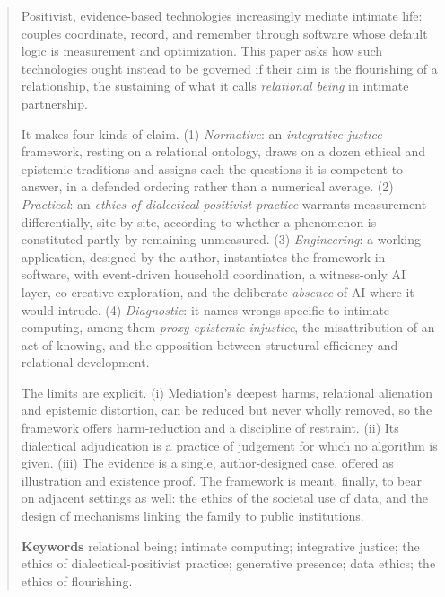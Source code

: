 
\begin{abstract}
\noindent
Positivist, evidence-based technologies increasingly mediate intimate life: couples coordinate, record, and remember through software whose default logic is measurement and optimization. This paper asks how such technologies ought instead to be governed if their aim is the flourishing of a relationship, the sustaining of what it calls \emph{relational being} in intimate partnership.

\smallskip
\noindent It makes four kinds of claim. (1) \emph{Normative}: an \emph{integrative-justice} framework, resting on a relational ontology, draws on a dozen ethical and epistemic traditions and assigns each the questions it is competent to answer, in a defended ordering rather than a numerical average. (2) \emph{Practical}: an \emph{ethics of dialectical-positivist practice} warrants measurement differentially, site by site, according to whether a phenomenon is constituted partly by remaining unmeasured. (3) \emph{Engineering}: a working application, designed by the author, instantiates the framework in software, with event-driven household coordination, a witness-only AI layer, co-creative exploration, and the deliberate \emph{absence} of AI where it would intrude. (4) \emph{Diagnostic}: it names wrongs specific to intimate computing, among them \emph{proxy epistemic injustice}, the misattribution of an act of knowing, and the opposition between structural efficiency and relational development.

\smallskip
\noindent The limits are explicit. (i) Mediation's deepest harms, relational alienation and epistemic distortion, can be reduced but never wholly removed, so the framework offers harm-reduction and a discipline of restraint. (ii) Its dialectical adjudication is a practice of judgement for which no algorithm is given. (iii) The evidence is a single, author-designed case, offered as illustration and existence proof. The framework is meant, finally, to bear on adjacent settings as well: the ethics of the societal use of data, and the design of mechanisms linking the family to public institutions.

\vspace{0.6em}
\noindent\textbf{Keywords}\quad
relational being; intimate computing; integrative justice; the ethics of dialectical-positivist practice; generative presence; data ethics; the ethics of flourishing.
\end{abstract}
\clearpage

